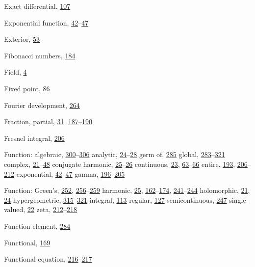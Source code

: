 \begin{theindex}
\item Exact differential, \hyperlink{orig-p107}{107}
\item Exponential function, \hyperlink{orig-p42}{42}--\hyperlink{orig-p47}{47}
\item Exterior, \hyperlink{orig-p53}{53}
\item Fibonacci numbers, \hyperlink{orig-p184}{184}
\item Field, \hyperlink{orig-p4}{4}
\item Fixed point, \hyperlink{orig-p86}{86}
\item Fourier development, \hyperlink{orig-p264}{264}
\item Fraction, partial, \hyperlink{orig-p31}{31}, \hyperlink{orig-p187}{187}--\hyperlink{orig-p190}{190}
\item Fresnel integral, \hyperlink{orig-p206}{206}
\item Function:
\subitem algebraic, \hyperlink{orig-p300}{300}--\hyperlink{orig-p306}{306}
\subitem analytic, \hyperlink{orig-p24}{24}--\hyperlink{orig-p28}{28}
\subsubitem germ of, \hyperlink{orig-p285}{285}
\subsubitem global, \hyperlink{orig-p283}{283}--\hyperlink{orig-p321}{321}
\subitem complex, \hyperlink{orig-p21}{21}--\hyperlink{orig-p48}{48}
\subitem conjugate harmonic, \hyperlink{orig-p25}{25}--\hyperlink{orig-p26}{26}
\subitem continuous, \hyperlink{orig-p23}{23}, \hyperlink{orig-p63}{63}--\hyperlink{orig-p66}{66}
\subitem entire, \hyperlink{orig-p193}{193}, \hyperlink{orig-p206}{206}--\hyperlink{orig-p212}{212}
\subitem exponential, \hyperlink{orig-p42}{42}--\hyperlink{orig-p47}{47}
\subitem gamma, \hyperlink{orig-p196}{196}--\hyperlink{orig-p205}{205}
\item Function:
\subitem Green's, \hyperlink{orig-p252}{252}, \hyperlink{orig-p256}{256}--\hyperlink{orig-p259}{259}
\subitem harmonic, \hyperlink{orig-p25}{25}, \hyperlink{orig-p162}{162}--\hyperlink{orig-p174}{174}, \hyperlink{orig-p241}{241}--\hyperlink{orig-p244}{244}
\subitem holomorphic, \hyperlink{orig-p21}{21}, \hyperlink{orig-p24}{24}
\subitem hypergeometric, \hyperlink{orig-p315}{315}--\hyperlink{orig-p321}{321}
\subitem integral, \hyperlink{orig-p113}{113}
\subitem regular, \hyperlink{orig-p127}{127}
\subitem semicontinuous, \hyperlink{orig-p247}{247}
\subitem single-valued, \hyperlink{orig-p22}{22}
\subitem zeta, \hyperlink{orig-p212}{212}--\hyperlink{orig-p218}{218}
\item Function element, \hyperlink{orig-p284}{284}
\item Functional, \hyperlink{orig-p169}{169}
\item Functional equation, \hyperlink{orig-p216}{216}--\hyperlink{orig-p217}{217}

\end{theindex}
